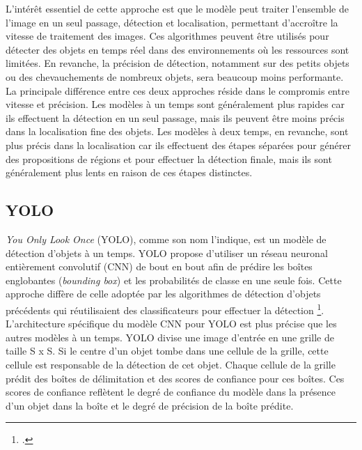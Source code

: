 \documentclass[12pt,twoside]{book}
\begin{document}
L’intérêt essentiel de cette approche est que le modèle peut traiter l'ensemble de l'image en un seul passage, détection et localisation, permettant d’accroître la vitesse de traitement des images. Ces algorithmes peuvent être utilisés pour détecter des objets en temps réel dans des environnements où les ressources sont limitées. En revanche, la précision de détection, notamment sur des petits objets ou des chevauchements de nombreux objets, sera beaucoup moins performante. \\

La principale différence entre ces deux approches réside dans le compromis entre vitesse et précision. Les modèles à un temps sont généralement plus rapides car ils effectuent la détection en un seul passage, mais ils peuvent être moins précis dans la localisation fine des objets. Les modèles à deux temps, en revanche, sont plus précis dans la localisation car ils effectuent des étapes séparées pour générer des propositions de régions et pour effectuer la détection finale, mais ils sont généralement plus lents en raison de ces étapes distinctes.



\subsection{YOLO}

\textit{You Only Look Once} (YOLO), comme son nom l’indique, est un modèle de détection d'objets à un temps. YOLO propose d'utiliser un réseau neuronal entièrement convolutif (CNN) de bout en bout afin de prédire les boîtes englobantes (\textit{bounding box}) et les probabilités de classe en une seule fois. Cette approche diffère de celle adoptée par les algorithmes de détection d'objets précédents qui réutilisaient des classificateurs pour effectuer la détection \footcite{redmon_you_2015}. \\

L'architecture spécifique du modèle CNN pour YOLO est plus précise que les autres modèles à un temps. YOLO divise une image d'entrée en une grille de taille S x S. Si le centre d'un objet tombe dans une cellule de la grille, cette cellule est responsable de la détection de cet objet. Chaque cellule de la grille prédit des boîtes de délimitation et des scores de confiance pour ces boîtes. Ces scores de confiance reflètent le degré de confiance du modèle dans la présence d'un objet dans la boîte et le degré de précision de la boîte prédite.\\
\end{document}
